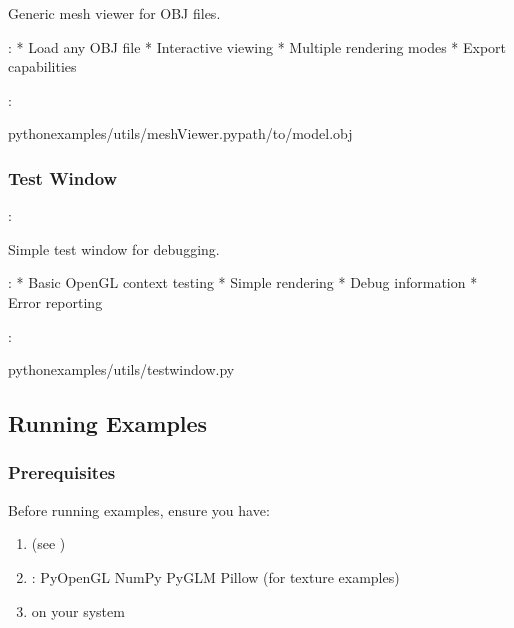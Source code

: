 \documentclass[a4paper,10pt,english,openany,oneside]{sphinxmanual}
\begin{document}
\sphinxAtStartPar
Generic mesh viewer for OBJ files.

\sphinxAtStartPar
{}:
* Load any OBJ file
* Interactive viewing
* Multiple rendering modes
* Export capabilities

\sphinxAtStartPar
{}:

\begin{sphinxVerbatim}[commandchars=\\\{\}]
pythonexamples/utils/meshViewer.pypath/to/model.obj
\end{sphinxVerbatim}


\subsubsection{Test Window}
\label{\detokenize{examples:test-window}}
\sphinxAtStartPar
{}: 

\sphinxAtStartPar
Simple test window for debugging.

\sphinxAtStartPar
{}:
* Basic OpenGL context testing
* Simple rendering
* Debug information
* Error reporting

\sphinxAtStartPar
{}:

\begin{sphinxVerbatim}[commandchars=\\\{\}]
pythonexamples/utils/test\PYGZus{}window.py
\end{sphinxVerbatim}


\subsection{Running Examples}
\label{\detokenize{examples:running-examples}}

\subsubsection{Prerequisites}
\label{\detokenize{examples:prerequisites}}
\sphinxAtStartPar
Before running examples, ensure you have:
\begin{enumerate}
%
\item {} 
\sphinxAtStartPar
{} (see {\hyperref[\detokenize{installation::doc}]{}})

\item {} 
\sphinxAtStartPar
{}:
\sphinxhyphen{} PyOpenGL
\sphinxhyphen{} NumPy
\sphinxhyphen{} PyGLM
\sphinxhyphen{} Pillow (for texture examples)

\item {} 
\sphinxAtStartPar
{} on your system

\end{enumerate}
\end{document}
